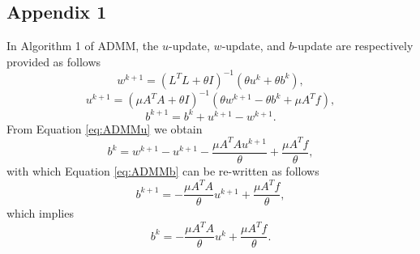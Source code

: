 \documentclass[letterpaper]{article} %
\begin{document}
\subsection*{Appendix 1}
In Algorithm 1 of ADMM, the $u$-update, $w$-update, and $b$-update are respectively provided as follows
\begin{equation} \label{eq:ADMMw}
{w^{k + 1}} = {\left( { {L^T}L + \theta I} \right)}^{ - 1}\left( {\theta {u^k} + \theta {b^k}} \right),
\end{equation}
\begin{equation} \label{eq:ADMMu}
{u^{k + 1}} = {\left( {\mu{A^T}A + \theta I} \right)}^{ - 1}\left( {\theta {w^{k + 1}} - \theta {b^k} + \mu{A^T}f} \right),
\end{equation}
\begin{equation} \label{eq:ADMMb}
	{b^{k + 1}} = {b^k} + {u^{k + 1}} - {w^{k + 1}}.
\end{equation}
From Equation \eqref{eq:ADMMu} we obtain
\begin{equation*}
	{b^k}={w^{k + 1}}-u^{k + 1}- \frac{{\mu{A^T}A  }  u^{k + 1}}{\theta}+ \frac{{\mu{A^T}f}}{\theta },
\end{equation*}
with which Equation \eqref{eq:ADMMb} can be re-written as follows
\begin{equation*} %
	{b^{k + 1}} =  - \frac{{\mu{A^T}A}}{\theta }{u^{k + 1}} + \frac{{\mu{A^T}f}}{\theta },
\end{equation*}
which implies 
\begin{equation} \label{eq:ADMMb3}
	{b^{k}} =  - \frac{{\mu{A^T}A}}{\theta }{u^{k}} + \frac{{\mu{A^T}f}}{\theta }.
\end{equation}
\end{document}
